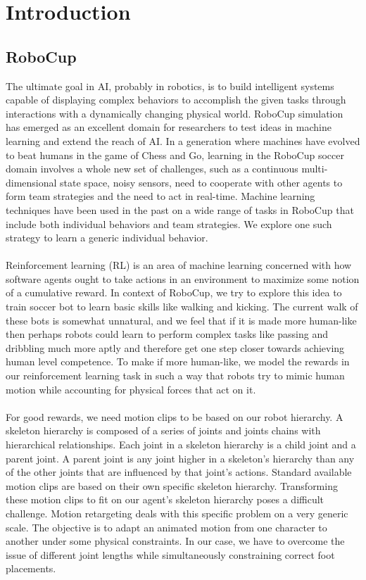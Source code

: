 \chapter{Introduction}

\section{RoboCup}
The ultimate goal in AI, probably in robotics, is to build intelligent systems capable of displaying complex behaviors to accomplish the given tasks through interactions with a dynamically changing physical world. RoboCup simulation has emerged as an excellent domain for researchers to test ideas in machine learning and extend the reach of AI. In a generation where machines have evolved to beat humans in the game of Chess and Go, learning in the RoboCup soccer domain involves a whole new set of challenges, such as a continuous multi-dimensional state space, noisy sensors, need to cooperate with other agents to form team strategies and the need to act in real-time. Machine learning techniques have been used in the past on a wide range of tasks in RoboCup that include both individual behaviors and team strategies. We explore one such strategy to learn a generic individual behavior. 
\\\\
Reinforcement learning (RL) is an area of machine learning concerned with how software agents ought to take actions in an environment to maximize some notion of a cumulative reward. In context of RoboCup, we try to explore this idea to train soccer bot to learn basic skills like walking and kicking. The current walk of these bots is somewhat unnatural, and we feel that if it is made more human-like then perhaps robots could learn to perform complex tasks like passing and dribbling much more aptly and therefore get one step closer towards achieving human level competence. To make if more human-like, we model the rewards in our reinforcement learning task in such a way that robots try to mimic human motion while accounting for physical forces that act on it.
\\\\
For good rewards, we need motion clips to be based on our robot hierarchy. A skeleton hierarchy is composed of a series of joints and joints chains with hierarchical relationships. Each joint in a skeleton hierarchy is a child joint and a parent joint. A parent joint is any joint higher in a skeleton's hierarchy than any of the other joints that are influenced by that joint's actions. Standard available motion clips are based on their own specific skeleton hierarchy. Transforming these motion clips to fit on our agent's skeleton hierarchy poses a difficult challenge. Motion retargeting deals with this specific problem on a very generic scale. The objective is to adapt an animated motion from one character to another under some physical constraints. In our case, we have to overcome the issue of different joint lengths while simultaneously constraining correct foot placements. 

